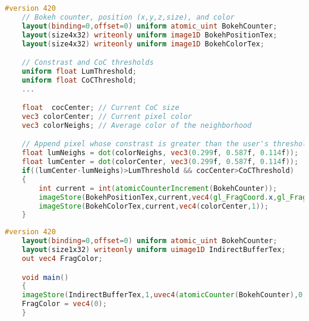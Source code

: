 \begin{lstlisting}[language=GLSL,float={htb},caption={Fragment shader for extracting \bokehs \emph{(Pass 2)}.},label={Derousiers:bokehextractionfs}]	
	#version 420
	// Bokeh counter, position (x,y,z,size), and color
	layout(binding=0,offset=0) uniform atomic_uint BokehCounter;
	layout(size4x32) writeonly uniform image1D BokehPositionTex;
	layout(size4x32) writeonly uniform image1D BokehColorTex;

	// Constrast and CoC thresholds
	uniform float LumThreshold;
	uniform float CoCThreshold;
	...

	float  cocCenter; // Current CoC size
	vec3 colorCenter; // Current pixel color
	vec3 colorNeighs; // Average color of the neighborhood

	// Append pixel whose constrast is greater than the user's threshold
	float lumNeighs = dot(colorNeighs, vec3(0.299f, 0.587f, 0.114f));
	float lumCenter = dot(colorCenter, vec3(0.299f, 0.587f, 0.114f));
	if((lumCenter-lumNeighs)>LumThreshold && cocCenter>CoCThreshold)
	{
		int current = int(atomicCounterIncrement(BokehCounter));
		imageStore(BokehPositionTex,current,vec4(gl_FragCoord.x,gl_FragCoord.y,depth,cocCenter));
		imageStore(BokehColorTex,current,vec4(colorCenter,1));
	}
\end{lstlisting}

\begin{lstlisting}[language=GLSL,float={htb},caption={Synchronization of the indirect buffer with the atomic counter \emph{(Pass 3/4)}.},label={Derousiers:synchronizationbokehfs}]
	#version 420
	layout(binding=0,offset=0) uniform atomic_uint BokehCounter;
	layout(size1x32) writeonly uniform uimage1D IndirectBufferTex;
	out vec4 FragColor;

	void main()
	{
	imageStore(IndirectBufferTex,1,uvec4(atomicCounter(BokehCounter),0,0,0));
	FragColor = vec4(0);
	}
\end{lstlisting}

